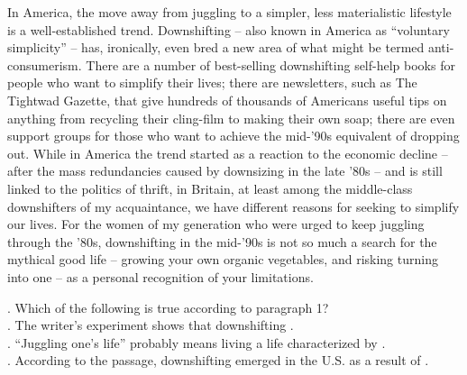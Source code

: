 In America, the move away from juggling to a simpler, less materialistic lifestyle is a well-established trend. Downshifting -- also known in America as “voluntary simplicity” -- has, ironically, even bred a new area of what might be termed anti-consumerism. There are a number of best-selling downshifting self-help books for people who want to simplify their lives; there are newsletters, such as The Tightwad Gazette, that give hundreds of thousands of Americans useful tips on anything from recycling their cling-film to making their own soap; there are even support groups for those who want to achieve the mid-’90s equivalent of dropping out.
While in America the trend started as a reaction to the economic decline -- after the mass redundancies caused by downsizing in the late ’80s -- and is still linked to the politics of thrift, in Britain, at least among the middle-class downshifters of my acquaintance, we have different reasons for seeking to simplify our lives.
For the women of my generation who were urged to keep juggling through the ’80s, downshifting in the mid-’90s is not so much a search for the mythical good life -- growing your own organic vegetables, and risking turning into one -- as a personal recognition of your limitations.
\begin{questions}  .	Which of the following is true according to paragraph 1?\\
    .	The writer’s experiment shows that downshifting \ltk{}.\\
    .	“Juggling one’s life” probably means living a life characterized by \ltk{}.\\
    .	According to the passage, downshifting emerged in the U.S. as a result of \ltk{}.\\
\end{questions}